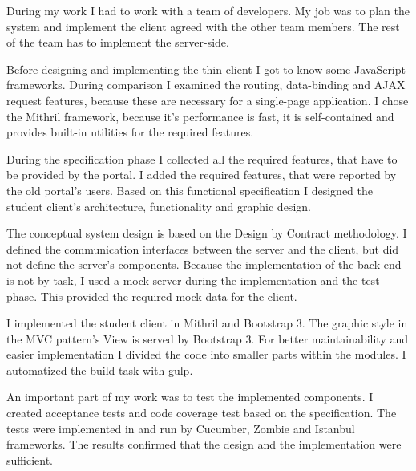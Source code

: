 During my work I had to work with a team of developers. My job was to plan the system and implement the client agreed with the other team members. The rest of the team has to implement the server-side.

Before designing and implementing the thin client I got to know some JavaScript frameworks. During comparison I examined the routing, data-binding and AJAX request features, because these are necessary for a single-page application. I chose the Mithril framework, because it's performance is fast, it is self-contained and provides built-in utilities for the required features.

During the specification phase I collected all the required features, that have to be provided by the portal. I added the required features, that were reported by the old portal's users. Based on this functional specification I designed the student client's architecture, functionality and graphic design.

The conceptual system design is based on the Design by Contract methodology. I defined the communication interfaces between the server and the client, but did not define the server's components. Because the implementation of the back-end is not by task, I used a mock server during the implementation and the test phase. This provided the required mock data for the client.

I implemented the student client in Mithril and Bootstrap 3. The graphic style in the MVC pattern's View is served by Bootstrap 3. For better maintainability and easier implementation I divided the code into smaller parts within the modules. I automatized the build task with gulp.

An important part of my work was to test the implemented components. I created acceptance tests and code coverage test based on the specification. The tests were implemented in and run by Cucumber, Zombie and Istanbul frameworks. The results confirmed that the design and the implementation were sufficient.


\vfill
\dolgozatnyelve
{}

\setcounter{romanPage}{\value{page}}
